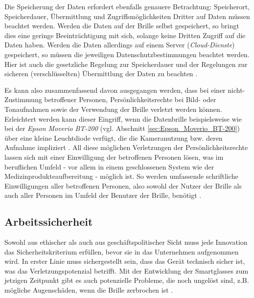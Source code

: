 Die Speicherung der Daten erfordert ebenfalls genauere Betrachtung: Speicherort, Speicherdauer, Übermittlung und Zugriffsmöglichkeiten Dritter auf Daten müssen beachtet werden. Werden die Daten auf der Brille selbst gespeichert, so bringt dies eine geringe Beeinträchtigung mit sich, solange keine Dritten Zugriff auf die Daten haben. Werden die Daten allerdings auf einem Server (\emph{Cloud-Dienste}) gespeichert, so müssen die jeweiligen Datenschutzbestimmungen beachtet werden. Hier ist auch die gesetzliche Regelung zur Speicherdauer und der Regelungen zur sicheren (verschlüsselten) Übermittlung der Daten zu beachten \cite[S.~165f]{Schwenke2016}.

Es kann also zusammenfassend davon ausgegangen werden, dass bei einer nicht-Zustimmung betroffener Personen, Persönlichkeitsrechte bei Bild- oder Tonaufnahmen sowie der Verwendung der Brille verletzt werden können. Erleichtert werden kann dieser Eingriff, wenn die Datenbrille beispielsweise wie bei der \emph{Epson Moverio BT-200} (vgl. Abschnitt \ref{sec:Epson_Moverio_BT-200}) über eine kleine Leuchtdiode verfügt, die die Kameranutzung bzw. deren Aufnahme impliziert \cite[S.~161]{Schwenke2016}. All diese möglichen Verletzungen der Persönlichkeitsrechte lassen sich mit einer Einwilligung der betroffenen Personen lösen, was im beruflichen Umfeld - vor allem in einem geschlossenen System wie der Medizinprodukteaufbereitung - möglich ist. So werden umfassende schriftliche Einwilligungen aller betroffenen Personen, also sowohl der Nutzer der Brille als auch aller Personen im Umfeld der Benutzer der Brille, benötigt \cite[S.~139f]{Schwenke2016}.
%
%
%
%
%
%
\subsection{Arbeitssicherheit}
\label{sec:Arbeitssicherheit}
Sowohl aus ethischer als auch aus geschäftspolitischer Sicht muss jede Innovation das Sicherheitskriterium erfüllen, bevor sie in das Unternehmen aufgenommen wird. In erster Linie muss sichergestellt sein, dass das Gerät technisch sicher ist, was das Verletzungspotenzial betrifft. Mit der Entwicklung der Smartglasses zum jetzigen Zeitpunkt gibt es auch potenzielle Probleme, die noch ungelöst sind, z.B. mögliche Augenschäden, wenn die Brille zerbrochen ist \cite{Hein2016}.

